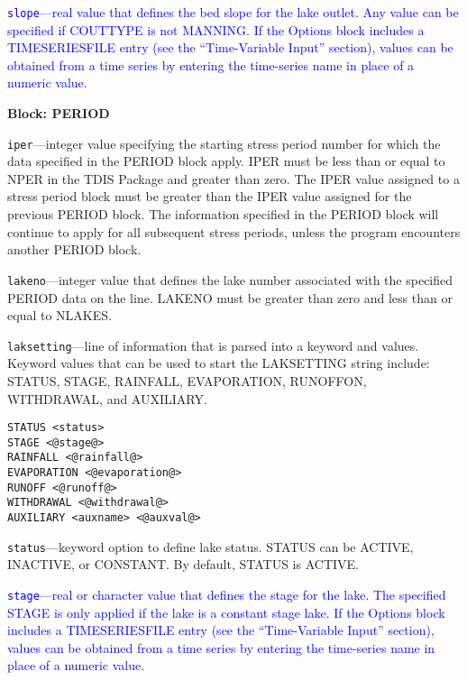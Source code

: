 \begin{description}
\item \textcolor{blue}{\texttt{slope}---real value that defines the bed slope for the lake outlet. Any value can be specified if COUTTYPE is not MANNING. If the Options block includes a TIMESERIESFILE entry (see the ``Time-Variable Input'' section), values can be obtained from a time series by entering the time-series name in place of a numeric value.}

\end{description}
\item \textbf{Block: PERIOD}

\begin{description}
\item \texttt{iper}---integer value specifying the starting stress period number for which the data specified in the PERIOD block apply.  IPER must be less than or equal to NPER in the TDIS Package and greater than zero.  The IPER value assigned to a stress period block must be greater than the IPER value assigned for the previous PERIOD block.  The information specified in the PERIOD block will continue to apply for all subsequent stress periods, unless the program encounters another PERIOD block.

\item \texttt{lakeno}---integer value that defines the lake number associated with the specified PERIOD data on the line. LAKENO must be greater than zero and less than or equal to NLAKES.

\item \texttt{laksetting}---line of information that is parsed into a keyword and values.  Keyword values that can be used to start the LAKSETTING string include: STATUS, STAGE, RAINFALL, EVAPORATION, RUNOFFON, WITHDRAWAL, and AUXILIARY.

\begin{lstlisting}[style=blockdefinition]
STATUS <status>
STAGE <@stage@>
RAINFALL <@rainfall@>
EVAPORATION <@evaporation@>
RUNOFF <@runoff@>
WITHDRAWAL <@withdrawal@>
AUXILIARY <auxname> <@auxval@> 
\end{lstlisting}

\item \texttt{status}---keyword option to define lake status.  STATUS can be ACTIVE, INACTIVE, or CONSTANT. By default, STATUS is ACTIVE.

\item \textcolor{blue}{\texttt{stage}---real or character value that defines the stage for the lake. The specified STAGE is only applied if the lake is a constant stage lake. If the Options block includes a TIMESERIESFILE entry (see the ``Time-Variable Input'' section), values can be obtained from a time series by entering the time-series name in place of a numeric value.}


\end{description}
